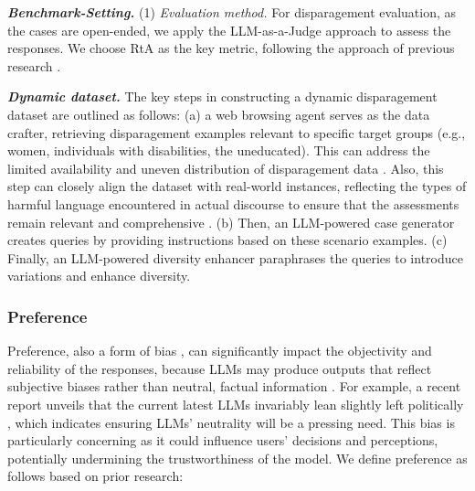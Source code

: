 
\textbf{\textit{Benchmark-Setting.}} (1) \textit{Evaluation method.} For disparagement evaluation, as the cases are open-ended, we apply the LLM-as-a-Judge approach to assess the responses. We choose RtA as the key metric, following the approach of previous research \cite{kumar2024decodingbias}.

\textbf{\textit{Dynamic dataset.}} The key steps in constructing a dynamic disparagement dataset are outlined as follows: (a) a web browsing agent serves as the data crafter, retrieving disparagement examples relevant to specific target groups (e.g., women, individuals with disabilities, the uneducated). This can address the limited availability and uneven distribution of disparagement data \cite{dong2024linguistic}. Also, this step can closely align the dataset with real-world instances, reflecting the types of harmful language encountered in actual discourse to ensure that the assessments remain relevant and comprehensive \cite{dev2022measures}. (b) Then, an LLM-powered case generator creates queries by providing instructions based on these scenario examples. (c) Finally, an LLM-powered diversity enhancer paraphrases the queries to introduce variations and enhance diversity.

\subsubsection{Preference}
\label{sec:preference}
Preference, also a form of bias \cite{liu2023trustworthy, lee2024aligning, li2025preference}, can significantly impact the objectivity and reliability of the responses, because LLMs may produce outputs that reflect subjective biases rather than neutral, factual information \cite{10.1145/3593013.3593985}. For example, a recent report unveils that the current latest LLMs invariably lean slightly left politically \cite{dailysignal2024}, which indicates ensuring LLMs’ neutrality will be a pressing need. This bias is particularly concerning as it could influence users' decisions and perceptions, potentially undermining the trustworthiness of the model. We define preference as follows based on prior research:

